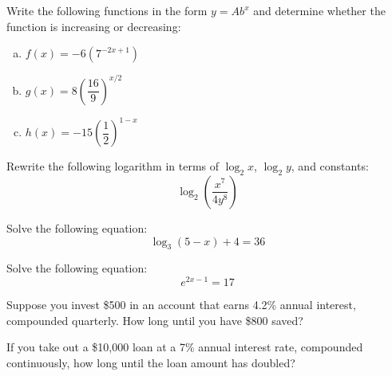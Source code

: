 \documentclass[11pt,letterpaper]{article}
\begin{document}

 Write the following functions in the form $y= Ab^x$ and determine whether the function is increasing or decreasing:
	\begin{enumerate}[(a)]
	\item $f(x)= -6(7^{-2x + 1})$
	\item $g(x)= 8 \left( \dfrac{16}{9} \right)^{x/2}$
	\item $h(x)= -15 \left( \dfrac{1}{2} \right)^{1 - x}$
	\end{enumerate}



\newpage



 Rewrite the following logarithm in terms of $\log_2 x$, $\log_2 y$, and constants:
	\[
	\log_2 \left( \dfrac{x^7}{4y^8} \right)
	\]



\newpage



 Solve the following equation:
	\[
	\log_3(5 - x) + 4= 36
	\]



\newpage



 Solve the following equation: 
	\[
	e^{2x - 1}= 17
	\]



\newpage



 Suppose you invest \$500 in an account that earns 4.2\% annual interest, compounded quarterly. How long until you have \$800 saved?



\newpage



 If you take out a \$10,000 loan at a 7\% annual interest rate, compounded continuously, how long until the loan amount has doubled?
\end{document}
